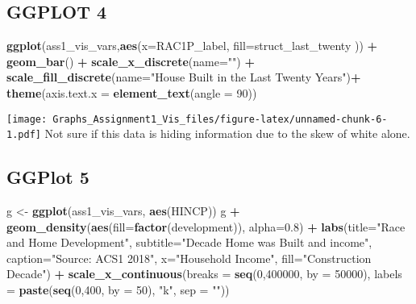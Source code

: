 \documentclass[
]{article}
\newenvironment{Shaded}{\begin{snugshade}}{\end{snugshade}}
\newcommand{\DataTypeTok}[1]{\textcolor[rgb]{0.13,0.29,0.53}{#1}}
\newcommand{\DecValTok}[1]{\textcolor[rgb]{0.00,0.00,0.81}{#1}}
\newcommand{\FloatTok}[1]{\textcolor[rgb]{0.00,0.00,0.81}{#1}}
\newcommand{\KeywordTok}[1]{\textcolor[rgb]{0.13,0.29,0.53}{\textbf{#1}}}
\newcommand{\NormalTok}[1]{#1}
\newcommand{\OperatorTok}[1]{\textcolor[rgb]{0.81,0.36,0.00}{\textbf{#1}}}
\newcommand{\StringTok}[1]{\textcolor[rgb]{0.31,0.60,0.02}{#1}}
\begin{document}
\hypertarget{ggplot-4}{%
\subsection{GGPLOT 4}\label{ggplot-4}}

\begin{Shaded}
\begin{Highlighting}[]
\KeywordTok{ggplot}\NormalTok{(ass1_vis_vars,}\KeywordTok{aes}\NormalTok{(}\DataTypeTok{x=}\NormalTok{RAC1P_label, }\DataTypeTok{fill=}\NormalTok{struct_last_twenty )) }\OperatorTok{+}
\StringTok{  }\KeywordTok{geom_bar}\NormalTok{() }\OperatorTok{+}
\StringTok{  }\KeywordTok{scale_x_discrete}\NormalTok{(}\DataTypeTok{name=}\StringTok{""}\NormalTok{) }\OperatorTok{+}
\StringTok{  }\KeywordTok{scale_fill_discrete}\NormalTok{(}\DataTypeTok{name=}\StringTok{"House Built in the Last Twenty Years"}\NormalTok{)}\OperatorTok{+}
\StringTok{  }\KeywordTok{theme}\NormalTok{(}\DataTypeTok{axis.text.x =} \KeywordTok{element_text}\NormalTok{(}\DataTypeTok{angle =} \DecValTok{90}\NormalTok{))}
\end{Highlighting}
\end{Shaded}

\texttt{[image: Graphs\_Assignment1\_Vis\_files/figure-latex/unnamed-chunk-6-1.pdf]}
Not sure if this data is hiding information due to the skew of white
alone.

\hypertarget{ggplot-5}{%
\subsection{GGPlot 5}\label{ggplot-5}}

\begin{Shaded}
\begin{Highlighting}[]
\NormalTok{g <-}\StringTok{ }\KeywordTok{ggplot}\NormalTok{(ass1_vis_vars, }\KeywordTok{aes}\NormalTok{(HINCP)) }
\NormalTok{g }\OperatorTok{+}\StringTok{ }\KeywordTok{geom_density}\NormalTok{(}\KeywordTok{aes}\NormalTok{(}\DataTypeTok{fill=}\KeywordTok{factor}\NormalTok{(development)), }\DataTypeTok{alpha=}\FloatTok{0.8}\NormalTok{) }\OperatorTok{+}\StringTok{ }
\StringTok{    }\KeywordTok{labs}\NormalTok{(}\DataTypeTok{title=}\StringTok{"Race and Home Development"}\NormalTok{, }
         \DataTypeTok{subtitle=}\StringTok{"Decade Home was Built and income"}\NormalTok{,}
         \DataTypeTok{caption=}\StringTok{"Source: ACS1 2018"}\NormalTok{,}
         \DataTypeTok{x=}\StringTok{"Household Income"}\NormalTok{,}
         \DataTypeTok{fill=}\StringTok{"Construction Decade"}\NormalTok{) }\OperatorTok{+}
\StringTok{  }\KeywordTok{scale_x_continuous}\NormalTok{(}\DataTypeTok{breaks =} \KeywordTok{seq}\NormalTok{(}\DecValTok{0}\NormalTok{,}\DecValTok{400000}\NormalTok{, }\DataTypeTok{by =} \DecValTok{50000}\NormalTok{),}
                     \DataTypeTok{labels =} \KeywordTok{paste}\NormalTok{(}\KeywordTok{seq}\NormalTok{(}\DecValTok{0}\NormalTok{,}\DecValTok{400}\NormalTok{, }\DataTypeTok{by =} \DecValTok{50}\NormalTok{),}
                     \StringTok{"k"}\NormalTok{, }\DataTypeTok{sep =} \StringTok{""}\NormalTok{)) }
\end{Highlighting}
\end{Shaded}
\end{document}
